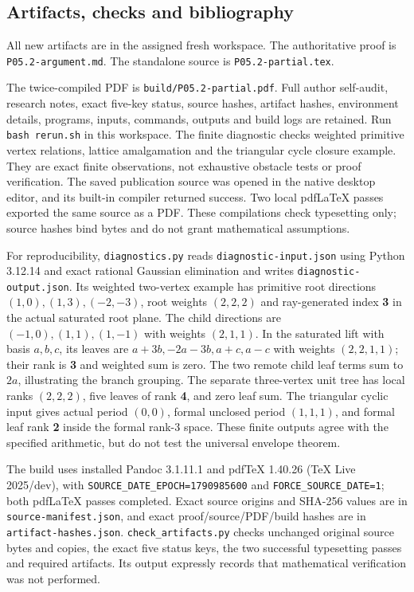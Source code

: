 \documentclass[
  11pt,
]{article}
\begin{document}
\subsection{Artifacts, checks and
bibliography}\label{artifacts-checks-and-bibliography}

All new artifacts are in the assigned fresh workspace. The authoritative
proof is \texttt{P05.2-argument.md}. The standalone source is
\texttt{P05.2-partial.tex}. 

The twice-compiled PDF is
\texttt{build/P05.2-partial.pdf}. Full author self-audit, research
notes, exact five-key status, source hashes, artifact hashes,
environment details, programs, inputs, commands, outputs and build logs
are retained. Run \texttt{bash\ rerun.sh} in this workspace. The finite
diagnostic checks weighted primitive vertex relations, lattice
amalgamation and the triangular cycle closure example. They are exact
finite observations, not exhaustive obstacle tests or proof
verification. The saved publication source was opened in the native desktop editor,
and its built-in compiler returned success. Two local pdfLaTeX passes
exported the same source as a PDF. These compilations check typesetting
only; source hashes bind bytes and do not grant mathematical assumptions.

For reproducibility, \texttt{diagnostics.py} reads
\texttt{diagnostic-input.json} using Python 3.12.14 and exact rational
Gaussian elimination and writes \texttt{diagnostic-output.json}. Its
weighted two-vertex example has primitive root directions
\((1,0),(1,3),(-2,-3)\), root weights \((2,2,2)\) and ray-generated
index \textbf{3} in the actual saturated root plane. The child
directions are \((-1,0),(1,1),(1,-1)\) with weights \((2,1,1)\). In the
saturated lift with basis \(a,b,c\), its leaves are
\(a+3b,-2a-3b,a+c,a-c\) with weights \((2,2,1,1)\); their rank is
\textbf{3} and weighted sum is zero. The two remote child leaf terms sum
to \textbf{\(2a\)}, illustrating the branch grouping. The separate
three-vertex unit tree has local ranks \((2,2,2)\), five leaves of rank
\textbf{4}, and zero leaf sum. The triangular cyclic input gives actual
period \textbf{\((0,0)\)}, formal unclosed period \textbf{\((1,1,1)\)},
and formal leaf rank \textbf{2} inside the formal rank-3 space. These
finite outputs agree with the specified arithmetic, but do not test the
universal envelope theorem.

The build uses installed Pandoc 3.1.11.1 and pdfTeX 1.40.26 (TeX Live
2025/dev), with \texttt{SOURCE\_DATE\_EPOCH=1790985600} and
\texttt{FORCE\_SOURCE\_DATE=1}; both pdfLaTeX passes completed. Exact
source origins and SHA-256 values are in \texttt{source-manifest.json},
and exact proof/source/PDF/build hashes are in
\texttt{artifact-hashes.json}. \texttt{check\_artifacts.py} checks
unchanged original source bytes and copies, the exact five status keys,
the two successful typesetting passes and required artifacts. Its output
expressly records that mathematical verification was not performed.
\end{document}
